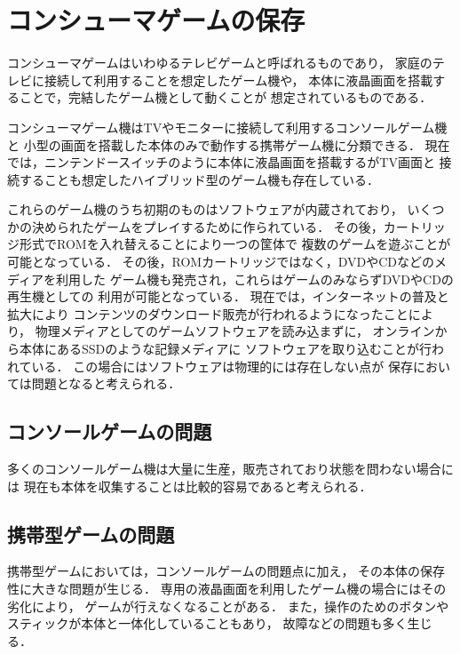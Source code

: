 \section{コンシューマゲームの保存}

コンシューマゲームはいわゆるテレビゲームと呼ばれるものであり，
家庭のテレビに接続して利用することを想定したゲーム機や，
本体に液晶画面を搭載することで，完結したゲーム機として動くことが
想定されているものである．

コンシューマゲーム機はTVやモニターに接続して利用するコンソールゲーム機と
小型の画面を搭載した本体のみで動作する携帯ゲーム機に分類できる．
現在では，ニンテンドースイッチのように本体に液晶画面を搭載するがTV画面と
接続することも想定したハイブリッド型のゲーム機も存在している．

これらのゲーム機のうち初期のものはソフトウェアが内蔵されており，
いくつかの決められたゲームをプレイするために作られている．
その後，カートリッジ形式でROMを入れ替えることにより一つの筐体で
複数のゲームを遊ぶことが可能となっている．
その後，ROMカートリッジではなく，DVDやCDなどのメディアを利用した
ゲーム機も発売され，これらはゲームのみならずDVDやCDの再生機としての
利用が可能となっている．
現在では，インターネットの普及と拡大により
コンテンツのダウンロード販売が行われるようになったことにより，
物理メディアとしてのゲームソフトウェアを読み込まずに，
オンラインから本体にあるSSDのような記録メディアに
ソフトウェアを取り込むことが行われている．
この場合にはソフトウェアは物理的には存在しない点が
保存においては問題となると考えられる．

\subsection{コンソールゲームの問題}
多くのコンソールゲーム機は大量に生産，販売されており状態を問わない場合には
現在も本体を収集することは比較的容易であると考えられる．

\subsection{携帯型ゲームの問題}
携帯型ゲームにおいては，コンソールゲームの問題点に加え，
その本体の保存性に大きな問題が生じる．
専用の液晶画面を利用したゲーム機の場合にはその劣化により，
ゲームが行えなくなることがある．
また，操作のためのボタンやスティックが本体と一体化していることもあり，
故障などの問題も多く生じる．




